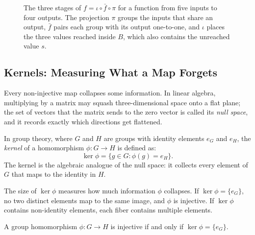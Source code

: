 \begin{figure}[htbp]
\caption{The three stages of $f = \iota \circ \bar{f} \circ \pi$ for a function from five inputs to four outputs. The projection $\pi$ groups the inputs that share an output, $\bar{f}$ pairs each group with its output one-to-one, and $\iota$ places the three values reached inside $B$, which also contains the unreached value $s$.}
\label{32:fig-canonical-example}
\end{figure}

\subsection{Kernels: Measuring What a Map Forgets}

Every non-injective map collapses some information. In linear algebra, multiplying by a matrix may squash three-dimensional space onto a flat plane; the set of vectors that the matrix sends to the zero vector is called its \emph{null space}, and it records exactly which directions get flattened.

In group theory, where $G$ and $H$ are groups with identity elements $e_G$ and $e_H$, the \emph{kernel} of a homomorphism $\phi: G \to H$ is defined as:
\[
\ker\phi = \{g \in G : \phi(g) = e_H\}.
\]
The kernel is the algebraic analogue of the null space: it collects every element of $G$ that maps to the identity in $H$.

\begin{intuitionbox}
The size of $\ker\phi$ measures how much information $\phi$ collapses. If $\ker\phi = \{e_G\}$, no two distinct elements map to the same image, and $\phi$ is injective. If $\ker\phi$ contains non-identity elements, each fiber contains multiple elements.
\end{intuitionbox}

\begin{theorem}\label{32:thm-kernel-injective}
A group homomorphism $\phi: G \to H$ is injective if and only if $\ker\phi = \{e_G\}$.
\end{theorem}

